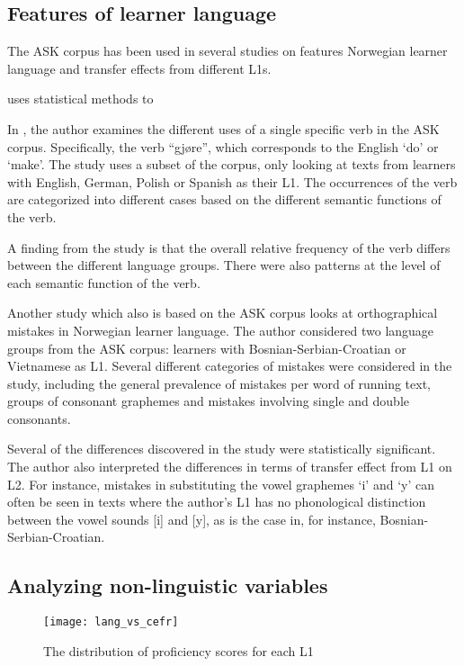 \subsection{Features of learner language}

The ASK corpus has been used in several studies on features Norwegian learner
language and transfer effects from different \acp{L1}.

\textcite{pepper2012} uses statistical methods to 

In \textcite{golden2016ask}, the author examines the different uses of a single
specific verb in the ASK corpus. Specifically, the verb ``gjøre'', which
corresponds to the English `do' or `make'. The study uses a subset of the
corpus, only looking at texts from learners with English, German, Polish or
Spanish as their \ac{L1}. The occurrences of the verb are categorized into
different cases based on the different semantic functions of the verb.

A finding from the study is that the overall relative frequency of the verb
differs between the different language groups. There were also patterns at
the level of each semantic function of the verb.

Another study \autocite{vigrestad2016} which also is based on the ASK corpus
looks at orthographical mistakes in Norwegian learner language. The author
considered two language groups from the ASK corpus: learners with
Bosnian-Serbian-Croatian or Vietnamese as \ac{L1}. Several different
categories of mistakes were considered in the study, including the general
prevalence of mistakes per word of running text, groups of consonant
graphemes and mistakes involving single and double consonants.

Several of the differences discovered in the study were statistically
significant. The author also interpreted the differences in terms of transfer
effect from \ac{L1} on \ac{L2}. For instance, mistakes in substituting the
vowel graphemes `i' and `y' can often be seen in texts where the author's L1
has no phonological distinction between the vowel sounds [i] and [y], as is
the case in, for instance, Bosnian-Serbian-Croatian.


\subsection{Analyzing non-linguistic variables}

\begin{figure}
  \centering
  \texttt{[image: lang\_vs\_cefr]}
  \caption{The distribution of proficiency scores for each L1}
  \label{fig:lang-vs-cefr}
\end{figure}
 
